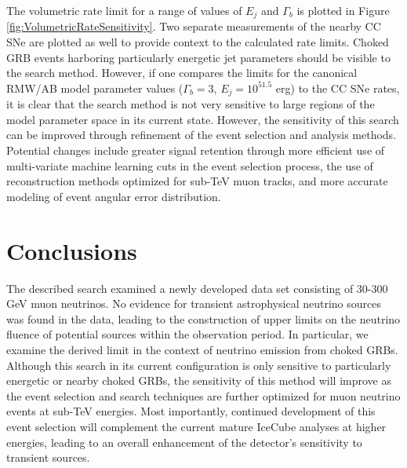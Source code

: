 \documentclass[manuscript]{aastex}
\begin{document}
The volumetric rate limit for a range of values of $E_j$ and $\Gamma_b$ is plotted in Figure \ref{fig:VolumetricRateSensitivity}. Two separate measurements of the nearby CC SNe are plotted as well to provide context to the calculated rate limits. Choked GRB events harboring particularly energetic jet parameters should be visible to the search method. However, if one compares the limits for the canonical RMW/AB model parameter values ($\Gamma_b = 3$, $E_j = 10^{51.5}$ erg) to the CC SNe rates, it is clear that the search method is not very sensitive to large regions of the model parameter space in its current state. However, the sensitivity of this search can be improved through refinement of the event selection and analysis methods. Potential changes include greater signal retention through more efficient use of multi-variate machine learning cuts in the event selection process, the use of reconstruction methods optimized for sub-TeV muon tracks, and more accurate modeling of event angular error distribution. 

\section{Conclusions}
The described search examined a newly developed data set consisting of 30-300 GeV muon neutrinos. No evidence for transient astrophysical neutrino sources was found in the data, leading to the construction of upper limits on the neutrino fluence of potential sources within the observation period. In particular, we examine the derived limit in the context of neutrino emission from choked GRBs. Although this search in its current configuration is only sensitive to particularly energetic or nearby choked GRBs, the sensitivity of this method will improve as the event selection and search techniques are further optimized for muon neutrino events at sub-TeV energies. Most importantly, continued development of this event selection will complement the current mature IceCube analyses at higher energies, leading to an overall enhancement of the detector's sensitivity to transient sources.
\end{document}
